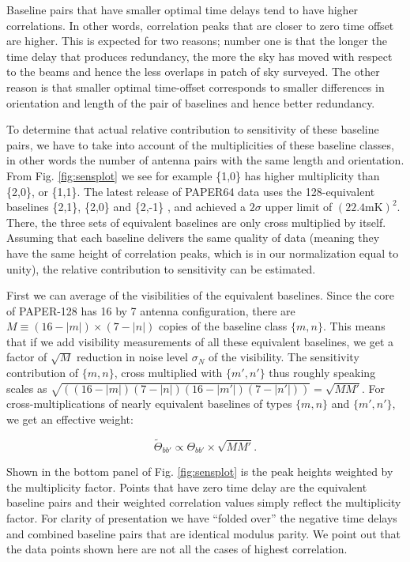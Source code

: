 \documentclass[twocolumn,apj,numberedappendix]{emulateapj}
\renewcommand\[{\begin{equation}}
\renewcommand\]{\end{equation}}
\begin{document}
Baseline pairs that have smaller optimal time delays
tend to have higher correlations. In other words, correlation peaks
that are closer to zero time offset are higher. This is expected for two reasons;
number one is that the longer the time delay that produces redundancy, the more the sky has moved with respect
to the beams and hence the less overlaps in patch of sky surveyed. The other reason is that smaller optimal
time-offset corresponds to smaller differences in orientation and length of the pair of baselines and hence better redundancy. 


To determine that actual relative contribution to sensitivity of these
baseline pairs, we have to take into account of the multiplicities of
these baseline classes, in other words the number of antenna pairs with the
same length and orientation. From Fig. \ref{fig:sensplot}
we see for example \{1,0\} has higher multiplicity than \{2,0\},
or \{1,1\}. The latest release of PAPER64 data uses the 128-equivalent baselines \{2,1\},
\{2,0\} and \{2,-1\} \citep{Ali2015}, and achieved a $2\sigma$ upper
limit of $(22.4\text{mK})^{2}$. There, the three sets of equivalent baselines
are only cross multiplied by itself. Assuming that each baseline delivers
the same quality of data (meaning they have the same height of correlation
peaks, which is in our normalization equal to unity), the relative
contribution to sensitivity can be estimated. 

First we can average of the visibilities of the equivalent baselines. Since the core of PAPER-128 has 16 by 7 antenna configuration, there
are $M\equiv(16-|m|)\times(7-|n|)$ copies of the baseline class $\{m,n\}$. This means
that if we add visibility measurements of all these equivalent baselines,
we get a factor of $\sqrt{M}$ reduction in noise
level $\sigma_N$ of the visibility. The sensitivity contribution of $\{m,n\}$, cross multiplied with $\{m',n'\}$  thus roughly speaking scales as $\sqrt{\left((16-|m|)(7-|n|)(16-|m'|)(7-|n'|)\right)}=\sqrt{MM'}$.
For cross-multiplications of nearly equivalent baselines of
types $\{m,n\}$ and $\{m',n'\}$, we get an effective weight: 

\begin{equation}
\widetilde{\Theta}_{bb'} \propto \Theta_{bb'}\times\sqrt{MM'}.\label{eq:sensul}
\end{equation}

Shown in the bottom panel of Fig. \ref{fig:sensplot} is the peak heights weighted
by the multiplicity factor. Points that have zero time delay are the equivalent baseline pairs and their weighted correlation values simply reflect the multiplicity factor. For clarity of presentation we have ``folded over'' the negative time delays and combined baseline pairs that are identical modulus parity. We point out that the data points shown here are not all the cases of highest correlation.  
\end{document}
